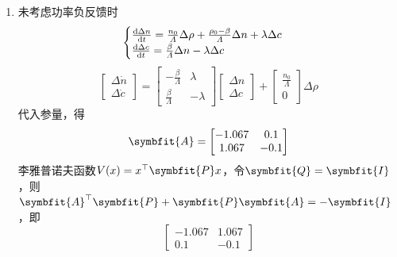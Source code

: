 \begin{exercise} %
    \begin{enumerate}
        \item 未考虑功率负反馈时
        \begin{equation*}
            \begin{cases}
                \frac{{\rm{d}}{\Delta n}}{{\rm{d}}{t}} = \frac{n_0}{\varLambda}\Delta \rho + \frac{\rho_0 - \beta}{\varLambda}\Delta n + \lambda \Delta c \\
                \frac{{\rm{d}}{\Delta c}}{{\rm{d}}{t}} = \frac{\beta}{\varLambda}\Delta n - \lambda \Delta c
            \end{cases}
        \end{equation*}
        \begin{equation*}
            \begin{bmatrix}
                \Delta \dot{n} \\
                \Delta \dot{c}
            \end{bmatrix} = \begin{bmatrix}
                -\frac{\beta}{\varLambda} & \lambda \\
                \frac{\beta}{\varLambda} & -\lambda
            \end{bmatrix} \begin{bmatrix}
                \Delta n \\
                \Delta c
            \end{bmatrix} + \begin{bmatrix}
                \frac{n_0}{\varLambda} \\
                0
            \end{bmatrix} \Delta \rho 
        \end{equation*}
        代入参量，得
        \begin{equation*}
            \symbfit{A} = \begin{bmatrix}
                -1.067 & 0.1 \\
                1.067 & -0.1
            \end{bmatrix}
        \end{equation*}
        李雅普诺夫函数$V(x) = x^{\top} \symbfit{P} x$，令$\symbfit{Q} = \symbfit{I}$，则$\symbfit{A}^{\top}\symbfit{P} + \symbfit{P}\symbfit{A} = -\symbfit{I}$，即
        \begin{equation*}
            \begin{bmatrix}
                -1.067 & 1.067 \\
                0.1 & -0.1

\end{bmatrix}
\end{equation*}
\end{enumerate}
\end{exercise}
